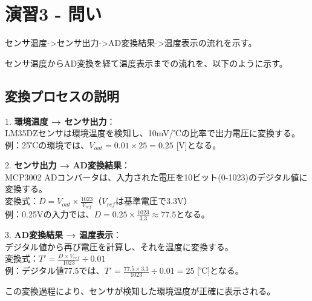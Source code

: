 \documentclass[a4paper,11pt,dvipdfmx]{jsarticle}
\begin{document}
\section{演習3 - 問い}
\begin{shaded}
    \noindent
    センサ温度->センサ出力->AD変換結果->温度表示の流れを示す。
\end{shaded}

センサ温度からAD変換を経て温度表示までの流れを、以下のように示す。

\subsection*{変換プロセスの説明}
1. \textbf{環境温度 → センサ出力}：\\
   LM35DZセンサは環境温度を検知し、10mV/℃の比率で出力電圧に変換する。\\
   例：25℃の環境では、$V_{out} = 0.01 \times 25 = 0.25$ [V]となる。

2. \textbf{センサ出力 → AD変換結果}：\\
   MCP3002 ADコンバータは、入力された電圧を10ビット(0-1023)のデジタル値に変換する。\\
   変換式：$D = V_{out} \times \frac{1023}{V_{ref}}$（$V_{ref}$は基準電圧で3.3V）\\
   例：0.25Vの入力では、$D = 0.25 \times \frac{1023}{3.3} \approx 77.5$となる。

3. \textbf{AD変換結果 → 温度表示}：\\
   デジタル値から再び電圧を計算し、それを温度に変換する。\\
   変換式：$T' = \frac{D \times V_{ref}}{1023} \div 0.01$\\
   例：デジタル値77.5では、$T' = \frac{77.5 \times 3.3}{1023} \div 0.01 = 25$ [℃]となる。

この変換過程により、センサが検知した環境温度が正確に表示される。

\newpage



\end{document}
